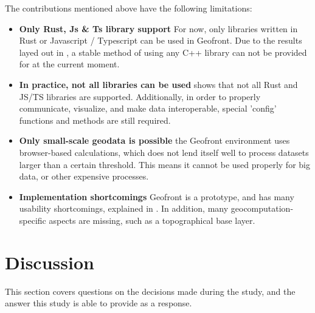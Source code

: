 The contributions mentioned above have the following limitations:
\begin{itemize}[-]
  \item \textbf{Only Rust, Js \& Ts library support}
  For now, only libraries written in Rust or Javascript / Typescript can be used in Geofront. 
  Due to the results layed out in , a stable method of using any C++ library can not be provided for at the current moment.

  \item \textbf{In practice, not all libraries can be used }
   shows that not all Rust and JS/TS libraries are supported. 
  Additionally, in order to properly communicate, visualize, and make data interoperable, special 'config' functions and methods are still required. 
  
  \item \textbf{Only small-scale geodata is possible}
  the Geofront environment uses browser-based calculations, which does not lend itself well to process datasets larger than a certain threshold. 
  This means it cannot be used properly for big data, or other expensive processes. 

  
  
  

  \item \textbf{Implementation shortcomings} 
  Geofront is a prototype, and has many usability shortcomings, explained in .
  In addition, many geocomputation-specific aspects are missing, such as a topographical base layer.  
\end{itemize}



\section{Discussion}
\label{sec:discussion}
This section covers questions on the decisions made during the study, and the answer this study is able to provide as a response.

